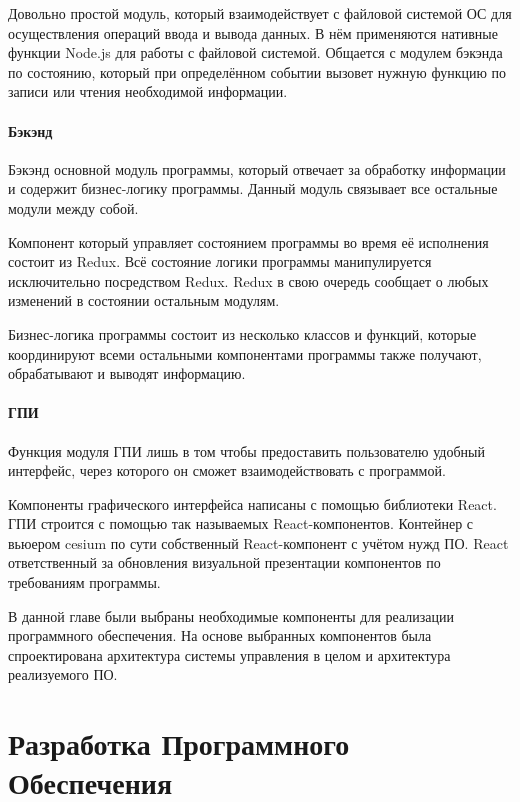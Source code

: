 \documentclass[specification,annotation]{itmo-student-thesis}
\begin{document}
Довольно простой модуль, который взаимодействует с файловой системой ОС для
осуществления операций ввода и вывода данных. В нём применяются нативные функции
Node.js для работы с файловой системой. Общается с модулем бэкэнда по состоянию,
который при определённом событии вызовет нужную функцию по записи или чтения
необходимой информации.

\subsubsection{Бэкэнд}\label{subsubsec:backend}

Бэкэнд основной модуль программы, который отвечает за обработку информации и
содержит бизнес-логику программы. Данный модуль связывает все остальные модули
между собой.

Компонент который управляет состоянием программы во время её исполнения состоит
из Redux. Всё состояние логики программы манипулируется исключительно
посредством Redux. Redux в свою очередь сообщает о любых изменений в состоянии
остальным модулям.

Бизнес-логика программы состоит из несколько классов и функций, которые
координируют всеми остальными компонентами программы также получают,
обрабатывают и выводят информацию.

\subsubsection{ГПИ}\label{subsubsec:gui}

Функция модуля ГПИ лишь в том чтобы предоставить пользователю удобный интерфейс,
через которого он сможет взаимодействовать с программой.

Компоненты графического интерфейса написаны с помощью библиотеки React. ГПИ
строится с помощью так называемых React-компонентов. Контейнер с вьюером cesium
по сути собственный React-компонент с учётом нужд ПО. React ответственный за
обновления визуальной презентации компонентов по требованиям программы.

\chapterconclusion

В данной главе были выбраны необходимые компоненты для реализации программного
обеспечения. На основе выбранных компонентов была спроектирована архитектура
системы управления в целом и архитектура реализуемого ПО.

\chapter{Разработка Программного Обеспечения}\label{ch:devprog}
\end{document}
